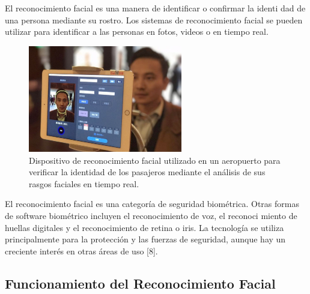 El reconocimiento facial es una manera de identificar o confirmar la identi
dad de una persona mediante su rostro. Los sistemas de reconocimiento facial
se pueden utilizar para identificar a las personas en fotos, videos o en tiempo
real.

\begin{figure}[H]
  \centering
  \includegraphics[width=0.6\textwidth]{imagenes_doc/Reconocimiento_Facial.jpg}
  \caption{Dispositivo de reconocimiento facial utilizado en un aeropuerto para verificar la identidad de los pasajeros mediante el análisis de sus rasgos faciales en tiempo real.}
  \label{fig:logo}
\end{figure}



El reconocimiento facial es una categoría de seguridad biométrica. Otras
formas de software biométrico incluyen el reconocimiento de voz, el reconoci
miento de huellas digitales y el reconocimiento de retina o iris. La tecnología
se utiliza principalmente para la protección y las fuerzas de seguridad, aunque
hay un creciente interés en otras áreas de uso [8].


\subsection{Funcionamiento del Reconocimiento Facial}

